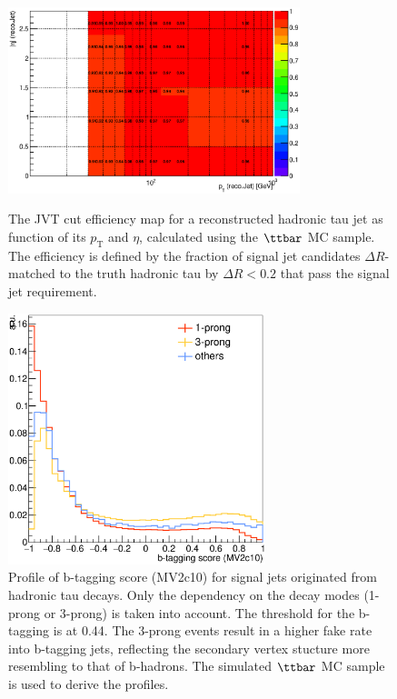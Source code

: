 \begin{figure}[htbp]
  \begin{center}
    \begin{minipage}[t]{.45\textwidth}
      \centering
      \includegraphics[width=85mm]{figures/BGestimation/ObjReplacement/method/tauRF/heff_vs_recoJetPt_recoJetEta.eps}
      \caption{The JVT cut efficiency map for a reconstructed hadronic tau jet as function of its $p_{\mathrm{T}}$ and $\eta$, calculated using the $\ttbar$ MC sample. The efficiency is defined by the fraction of signal jet candidates $\Delta R$-matched to the truth hadronic tau by $\Delta R<0.2$ that pass the signal jet requirement. }
      \label{fig::BGestimation::objRep::effJVT}
    \end{minipage}
    \hfill
    \begin{minipage}[t]{.45\textwidth}
      \centering
      \includegraphics[width=75mm]{figures/BGestimation/ObjReplacement/method/tauRF/hadTau_bTagScore.eps}
      \caption{Profile of b-tagging score (MV2c10) for signal jets originated from hadronic tau decays. Only the dependency on the decay modes (1-prong or 3-prong) is taken into account. The threshold for the b-tagging is at 0.44. 
The 3-prong events result in a higher fake rate into b-tagging jets, reflecting the secondary vertex stucture more resembling to that of b-hadrons. The simulated $\ttbar$ MC sample is used to derive the profiles. }
      \label{fig::BGestimation::objRep::tau_bTagScore}
    \end{minipage}
  \end{center}
\end{figure}

